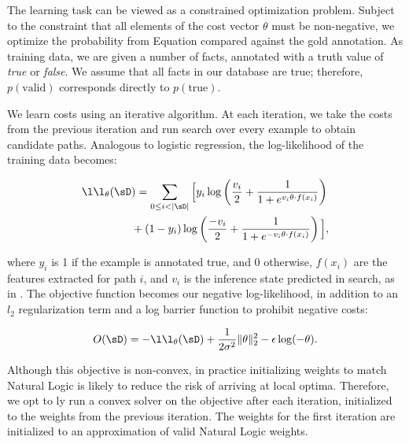 The learning task can be viewed as a constrained optimization problem.
Subject to the constraint that all elements of the cost vector $\theta$ 
  must be non-negative, we optimize the probability from
  Equation  compared against the gold annotation.
As training data, we are given a number of facts, annotated with a
  truth value of \textit{true} or \textit{false}.
We assume that all facts in our database are true; therefore,
  $p(\textrm{valid})$ corresponds directly to $p(\textrm{true})$.

We learn costs using an iterative algorithm.
At each iteration, we take the costs from the previous iteration
  and run search over every example to obtain candidate paths.
Analogous to logistic regression,
  the log-likelihood of the training data becomes:

\vspace{-0.5em}
\begin{align*}
\l\l_\theta(\sD&) = \sum_{0 \leq i < |\sD|} \Big[
    y_i \log \left(\frac{v_i}{2} + \frac{1}{1 + e^{v_i \theta \cdot f(x_i)}} \right) \\
    &+ (1 - y_i) \log \left(\frac{-v_i}{2} + \frac{1}{1 + e^{-v_i \theta \cdot f(x_i)}} \right)
  \Big],
\end{align*}
\vspace{-0.5em}

\noindent where $y_i$ is 1 if the example is annotated true, and 0
  otherwise, $f(x_i)$ are the features extracted for path $i$, and
  $v_i$ is the inference state predicted in search, as in
  .
The objective function becomes our negative log-likelihood, in addition
  to an $l_2$ regularization term and a log barrier function to 
  prohibit negative costs:
\vspace{-0.5em}

\begin{equation*}
O(\sD) = -\l\l_\theta(\sD) 
  + \frac{1}{2 \sigma^2}\|\theta\|_2^2
  - \epsilon \log(-\theta).
\end{equation*}
\vspace{-0.5em}

Although this objective is non-convex, in practice initializing weights
  to match Natural Logic is likely to reduce the risk of arriving at
  local optima.
Therefore, we opt to \naive ly run a convex solver on the objective after
  each iteration, initialized to the weights from the previous
  iteration.
The weights for the first iteration are initialized to an approximation
  of valid Natural Logic weights.


